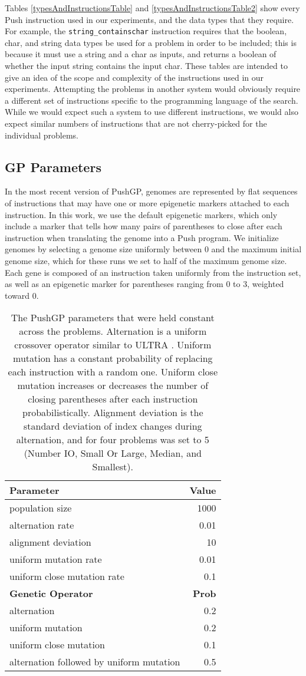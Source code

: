 \documentclass{sig-alternate}
\begin{document}
Tables \ref{typesAndInstructionsTable} and \ref{typesAndInstructionsTable2} show every Push instruction used in our experiments, and the data types that they require. For example, the \texttt{string\_containschar} instruction requires that the boolean, char, and string data types be used for a problem in order to be included; this is because it must use a string and a char as inputs, and returns a boolean of whether the input string contains the input char. These tables are intended to give an idea of the scope and complexity of the instructions used in our experiments. Attempting the problems in another system would obviously require a different set of instructions specific to the programming language of the search. While we would expect such a system to use different instructions, we would also expect similar numbers of instructions that are not cherry-picked for the individual problems.


\subsection{GP Parameters}


In the most recent version of PushGP, genomes are represented by flat sequences of instructions that may have one or more epigenetic markers attached to each instruction. In this work, we use the default epigenetic markers, which only include a marker that tells how many pairs of parentheses to close after each instruction when translating the genome into a Push program. We initialize genomes by selecting a genome size uniformly between 0 and the maximum initial genome size, which for these runs we set to half of the maximum genome size. Each gene is composed of an instruction taken uniformly from the instruction set, as well as an epigenetic marker for parentheses ranging from 0 to 3, weighted toward 0.

\begin{table}%
\centering
\caption{The PushGP parameters that were held constant across the problems. Alternation is a uniform crossover operator similar to ULTRA \cite{spector:2014:GPTP}. Uniform mutation has a constant probability of replacing each instruction with a random one. Uniform close mutation increases or decreases the number of closing parentheses after each instruction probabilistically. Alignment deviation is the standard deviation of index changes during alternation, and for four problems was set to 5 (Number IO, Small Or Large, Median, and Smallest).}
\label{tableGPconstantParams}
\begin{tabular}{l r}
\toprule
\textbf{Parameter} & \textbf{Value} \tabularnewline
\midrule
population size & 1000 \tabularnewline
alternation rate & 0.01 \tabularnewline
alignment deviation & 10 \tabularnewline
uniform mutation rate & 0.01 \tabularnewline
uniform close mutation rate & 0.1 \tabularnewline
\midrule
\textbf{Genetic Operator} & \textbf{Prob} \tabularnewline
\midrule
alternation & 0.2 \tabularnewline
uniform mutation & 0.2 \tabularnewline
uniform close mutation & 0.1 \tabularnewline
alternation followed by uniform mutation & 0.5 \tabularnewline
\bottomrule
\end{tabular}
\end{table}
\end{document}

